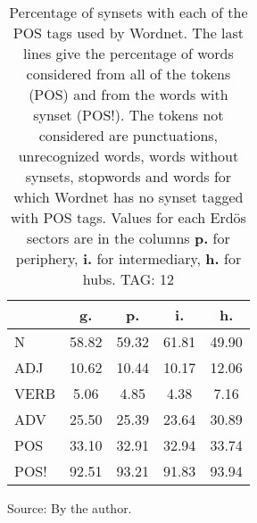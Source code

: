 \begin{table}[h!]
\begin{center}
	\caption{Percentage of synsets with each of the POS tags used by Wordnet. The last lines give the percentage of words considered from all of the tokens (POS) and from the words with synset (POS!). The tokens not considered are punctuations, unrecognized words, words without synsets, stopwords and words for which Wordnet has no synset  tagged with POS tags. Values for each Erd\"os sectors are in the columns {{\bf p.}} for periphery, {{\bf i.}} for intermediary, {{\bf h.}} for hubs. TAG: 12}\label{tab:wnpos}
\begin{tabular}{l || c | c | c | c}\hline
 & {\bf g.} & {\bf p.} & {\bf i.} & {\bf h.} \\\hline\hline
N & 58.82  & 59.32  & 61.81  & 49.90 \\
ADJ & 10.62  & 10.44  & 10.17  & 12.06 \\
VERB & 5.06  & 4.85  & 4.38  & 7.16 \\
ADV & 25.50  & 25.39  & 23.64  & 30.89 \\\hline\hline
POS & 33.10  & 32.91  & 32.94  & 33.74 \\
POS! & 92.51  & 93.21  & 91.83  & 93.94 \\\hline
\end{tabular}
\begin{flushleft}\footnotesize
		Source: By the author.\
\end{flushleft}
\end{center}
\end{table}
